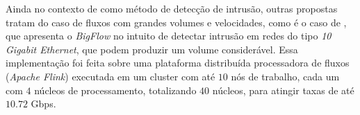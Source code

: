 Ainda no contexto de \nd como método de detecção de intrusão, outras propostas
tratam do caso de fluxos com grandes volumes e velocidades, como é o caso de
, que apresenta o \emph{BigFlow} no intuito de detectar
intrusão em redes do tipo \emph{10 Gigabit Ethernet}, que podem produzir um
volume considerável.
Essa implementação foi feita sobre uma plataforma distribuída processadora de
fluxos (\emph{Apache Flink}) executada em um cluster com até $10$ nós de trabalho,
cada um com $4$ núcleos de processamento, totalizando $40$ núcleos, para atingir
taxas de até $10.72$ Gbps.





